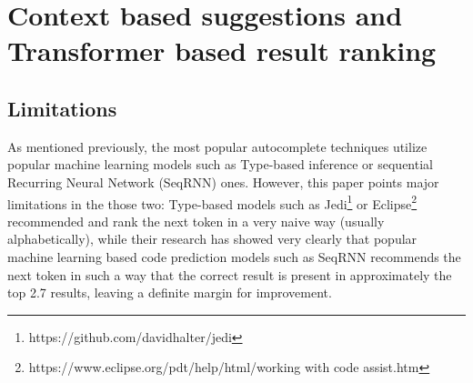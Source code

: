 \documentclass[sigplan,screen,9pt]{acmart}
\begin{document}
    \section{Context based suggestions and Transformer based result ranking}
    \subsection{Limitations}
    As mentioned previously, the most popular autocomplete techniques utilize popular machine learning models such as Type-based inference or sequential Recurring Neural Network (SeqRNN) ones. However, this paper points major limitations in the those two: Type-based models such as Jedi\footnote{https://github.com/davidhalter/jedi} or Eclipse\footnote{https://www.eclipse.org/pdt/help/html/working with code assist.htm} recommended and rank the next token in a very naive way (usually alphabetically), while their research has showed very clearly that popular machine learning based code prediction models such as SeqRNN recommends the next token in such a way that the correct result is present in approximately the top 2.7 results, leaving a definite margin for improvement.\cite{FeedTree}
\end{document}
